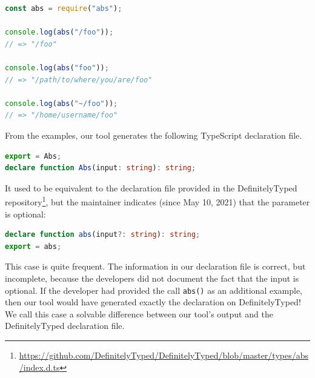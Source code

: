 \documentclass[sigplan,screen]{acmart}
\begin{document}
\begin{lstlisting}[language=JavaScript,numbers=none]
const abs = require("abs");
 
console.log(abs("/foo"));
// => "/foo"
 
console.log(abs("foo"));
// => "/path/to/where/you/are/foo"
 
console.log(abs("~/foo"));
// => "/home/username/foo"
\end{lstlisting}
From the examples, our tool generates the following TypeScript declaration file.
\begin{lstlisting}[language=TypeScript,numbers=none]
export = Abs;
declare function Abs(input: string): string;
\end{lstlisting}
It used to be equivalent to the declaration file provided in the
DefinitelyTyped
repository\footnote{\url{https://github.com/DefinitelyTyped/DefinitelyTyped/blob/master/types/abs/index.d.ts}},
but the maintainer indicates (since May 10, 2021) that the parameter is optional:
\begin{lstlisting}[language=TypeScript,numbers=none]
declare function abs(input?: string): string;
export = abs;
\end{lstlisting}
This case is quite frequent. The information in our declaration file is
correct, but incomplete, because the developers did not document the
fact that the input is optional. If the developer had provided the
call  \lstinline/abs()/ as an additional 
example, then our tool would have generated exactly
the declaration on DefinitelyTyped! We call this case a solvable
difference between our tool's output and the DefinitelyTyped
declaration file.

\end{document}

